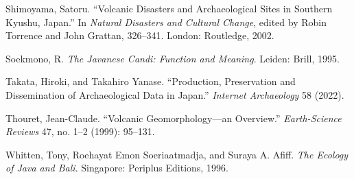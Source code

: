 \documentclass[12pt,a4paper]{article}
\begin{document}
\vspace{0.5em}
\noindent Shimoyama, Satoru. ``Volcanic Disasters and Archaeological Sites in Southern Kyushu, Japan.'' In \emph{Natural Disasters and Cultural Change}, edited by Robin Torrence and John Grattan, 326--341. London: Routledge, 2002.

\vspace{0.5em}
\noindent Soekmono, R. \emph{The Javanese Candi: Function and Meaning}. Leiden: Brill, 1995.

\vspace{0.5em}
\noindent Takata, Hiroki, and Takahiro Yanase. ``Production, Preservation and Dissemination of Archaeological Data in Japan.'' \emph{Internet Archaeology} 58 (2022).

\vspace{0.5em}
\noindent Thouret, Jean-Claude. ``Volcanic Geomorphology---an Overview.'' \emph{Earth-Science Reviews} 47, no. 1--2 (1999): 95--131.

\vspace{0.5em}
\noindent Whitten, Tony, Roehayat Emon Soeriaatmadja, and Suraya A. Afiff. \emph{The Ecology of Java and Bali}. Singapore: Periplus Editions, 1996.
\end{document}
